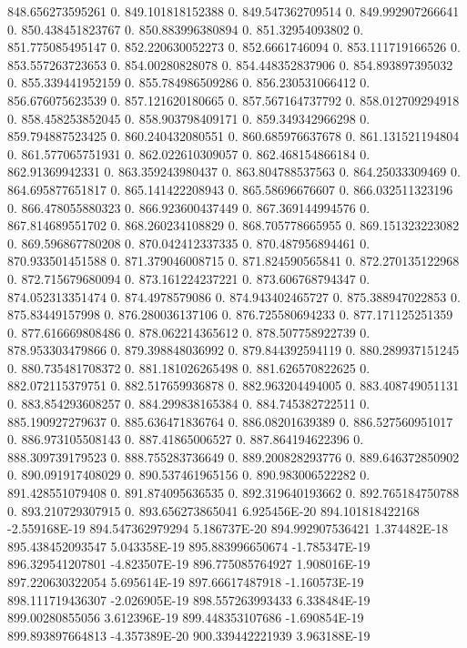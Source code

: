 848.656273595261  0.
849.101818152388  0.
849.547362709514  0.
849.992907266641  0.
850.438451823767  0.
850.883996380894  0.
851.32954093802  0.
851.775085495147  0.
852.220630052273  0.
852.6661746094  0.
853.111719166526  0.
853.557263723653  0.
854.00280828078  0.
854.448352837906  0.
854.893897395032  0.
855.339441952159  0.
855.784986509286  0.
856.230531066412  0.
856.676075623539  0.
857.121620180665  0.
857.567164737792  0.
858.012709294918  0.
858.458253852045  0.
858.903798409171  0.
859.349342966298  0.
859.794887523425  0.
860.240432080551  0.
860.685976637678  0.
861.131521194804  0.
861.577065751931  0.
862.022610309057  0.
862.468154866184  0.
862.91369942331  0.
863.359243980437  0.
863.804788537563  0.
864.25033309469  0.
864.695877651817  0.
865.141422208943  0.
865.58696676607  0.
866.032511323196  0.
866.478055880323  0.
866.923600437449  0.
867.369144994576  0.
867.814689551702  0.
868.260234108829  0.
868.705778665955  0.
869.151323223082  0.
869.596867780208  0.
870.042412337335  0.
870.487956894461  0.
870.933501451588  0.
871.379046008715  0.
871.824590565841  0.
872.270135122968  0.
872.715679680094  0.
873.161224237221  0.
873.606768794347  0.
874.052313351474  0.
874.4978579086  0.
874.943402465727  0.
875.388947022853  0.
875.83449157998  0.
876.280036137106  0.
876.725580694233  0.
877.171125251359  0.
877.616669808486  0.
878.062214365612  0.
878.507758922739  0.
878.953303479866  0.
879.398848036992  0.
879.844392594119  0.
880.289937151245  0.
880.735481708372  0.
881.181026265498  0.
881.626570822625  0.
882.072115379751  0.
882.517659936878  0.
882.963204494005  0.
883.408749051131  0.
883.854293608257  0.
884.299838165384  0.
884.745382722511  0.
885.190927279637  0.
885.636471836764  0.
886.08201639389  0.
886.527560951017  0.
886.973105508143  0.
887.41865006527  0.
887.864194622396  0.
888.309739179523  0.
888.755283736649  0.
889.200828293776  0.
889.646372850902  0.
890.091917408029  0.
890.537461965156  0.
890.983006522282  0.
891.428551079408  0.
891.874095636535  0.
892.319640193662  0.
892.765184750788  0.
893.210729307915  0.
893.656273865041  6.925456E-20
894.101818422168  -2.559168E-19
894.547362979294  5.186737E-20
894.992907536421  1.374482E-18
895.438452093547  5.043358E-19
895.883996650674  -1.785347E-19
896.329541207801  -4.823507E-19
896.775085764927  1.908016E-19
897.220630322054  5.695614E-19
897.66617487918  -1.160573E-19
898.111719436307  -2.026905E-19
898.557263993433  6.338484E-19
899.00280855056  3.612396E-19
899.448353107686  -1.690854E-19
899.893897664813  -4.357389E-20
900.339442221939  3.963188E-19
